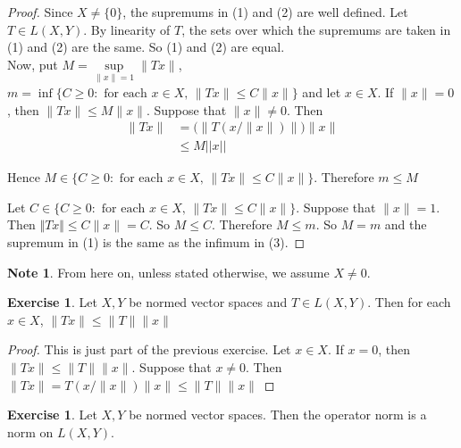 \documentclass[12pt]{amsart}
\theoremstyle{definition}
\newtheorem{note}[definition]{Note}
\newtheorem{ex}[definition]{Exercise}
\begin{document}
	\begin{proof} Since $X \neq \{0\}$, the supremums in (1) and (2) are well defined. Let $T \in L(X,Y)$. By linearity of $T$, the sets over which the supremums are taken in (1) and (2) are the same. So (1) and (2) are equal.\vspace{1cm}\\
		
		Now, put $M = \sup\limits_{\|x \|=1} \|Tx \|$, $m = \inf \{C \geq 0: \text{ for each }x \in X\text{, } \|Tx \|\leq C \|x \|\}$ and let $x \in X$. If $\|x \|=0$, then $\|Tx \|\leq M \|x \|$. Suppose that $\|x \|\neq 0$. Then 
		\begin{align*}
			\|Tx \|
			&= \bigg(\big\|T(x/\|x\|)\big\|\bigg)\|x \|\\
			& \leq M ||x||
		\end{align*}
		
		Hence $M \in \{C \geq 0: \text{ for each }x \in X\text{, } \|Tx \|\leq C \|x \|\}$. Therefore $m \leq M$
		
		Let $C \in \{C \geq 0: \text{ for each }x \in X\text{, } \|Tx \|\leq C \|x\|\}$. Suppose that $\|x \|=1$. Then $\Vert Tx\Vert \leq C \|x \|= C$. So $M \leq C$. Therefore $M \leq m$. So $M=m$ and the supremum in (1) is the same as the infimum in (3). 
	\end{proof}
	
	\begin{note}
		From here on, unless stated otherwise, we assume $X \neq 0$.
	\end{note}
	
	\begin{ex}
		Let $X,Y$ be normed vector spaces and $T \in L(X,Y)$. Then for each $x \in X$, $\|Tx \| \leq \|T\|\|x \|$
	\end{ex}
	
	\begin{proof}
		This is just part of the previous exercise. Let $x \in X$. If $x = 0$, then $\|Tx \|\leq \|T \|\|x \|$. Suppose that $x \neq 0$. Then $\|Tx \|= T(x/\|x\|)\|x\|\leq \|T \|\|x \|$
	\end{proof}
	
	\begin{ex}
		Let $X, Y$ be normed vector spaces. Then the operator norm is a norm on $L(X,Y)$.
	\end{ex}
	
\end{document}
